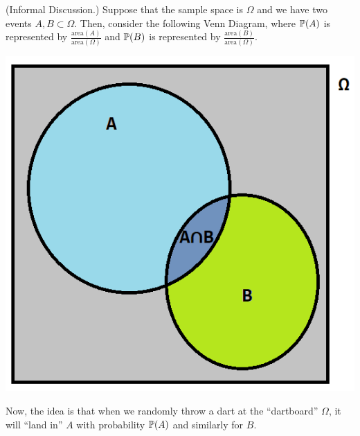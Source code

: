 \begin{mdframed}[]
    (Informal Discussion.) Suppose that the sample space is $\Omega$ and we have two events $A, B \subset \Omega$. Then, consider the following Venn Diagram, where $\mathbb{P}(A)$ is represented by $\frac{\text{area}(A)}{\text{area}(\Omega)}$ and $\mathbb{P}(B)$ is represented by $\frac{\text{area}(B)}{\text{area}(\Omega)}$. 
    \begin{center}
        \includegraphics[scale=0.7]{assets/venn1.png}
    \end{center}
    Now, the idea is that when we randomly throw a dart at the ``dartboard'' $\Omega$, it will ``land in'' $A$ with probability $\mathbb{P}(A)$ and similarly for $B$. 
    
    \bigskip 
    

\end{mdframed}
